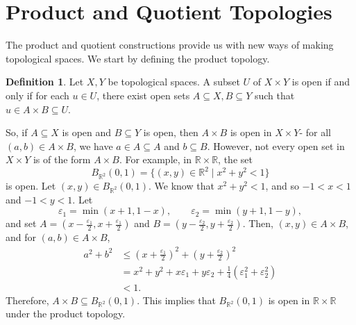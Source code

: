 \documentclass[a4paper, openany]{memoir}
\theoremstyle{definition}
\newtheorem{definition}{Definition}[section]
\theoremstyle{plain}
\begin{document}
\section{Product and Quotient Topologies}
The product and quotient constructions provide us with new ways of making topological spaces. We start by defining the product topology.
\begin{definition}
Let $X, Y$ be topological spaces. A subset $U$ of $X \times Y$ is open if and only if for each $u \in U$, there exist open sets $A \subseteq X, B \subseteq Y$ such that $u \in A \times B \subseteq U$.
\end{definition}
\noindent So, if $A \subseteq X$ is open and $B \subseteq Y$ is open, then $A \times B$ is open in $X \times Y$- for all $(a, b) \in A \times B$, we have $a \in A \subseteq A$ and $b \subseteq B$. However, not every open set in $X \times Y$ is of the form $A \times B$. For example, in $\mathbb{R} \times \mathbb{R}$, the set
\[B_{\mathbb{R}^2}(0, 1) = \{(x, y) \in \mathbb{R}^2 \mid x^2 + y^2 < 1\}\]
is open. Let $(x, y) \in B_{\mathbb{R}^2}(0, 1)$. We know that $x^2 + y^2 < 1$, and so $-1 < x < 1$ and $-1 < y < 1$. Let
\[\varepsilon_1 = \min(x+1, 1-x), \qquad \varepsilon_2 = \min(y+1, 1-y),\]
and set $A = (x-\frac{\varepsilon_1}{2}, x+\frac{\varepsilon_1}{2})$ and $B = (y-\frac{\varepsilon_2}{2}, y+\frac{\varepsilon_2}{2})$. Then, $(x, y) \in A \times B$, and for $(a, b) \in A \times B$,
\begin{align*}
    a^2 + b^2 &\leqslant (x+\tfrac{\varepsilon_1}{2})^2 + (y+\tfrac{\varepsilon_2}{2})^2 \\
    &= x^2 + y^2 + x \varepsilon_1 + y \varepsilon_2 + \frac{1}{4} (\varepsilon_1^2 + \varepsilon_2^2) \\
    &< 1.
\end{align*}
Therefore, $A \times B \subseteq B_{\mathbb{R}^2}(0, 1)$. This implies that $B_{\mathbb{R}^2}(0, 1)$ is open in $\mathbb{R} \times \mathbb{R}$ under the product topology.
\end{document}
